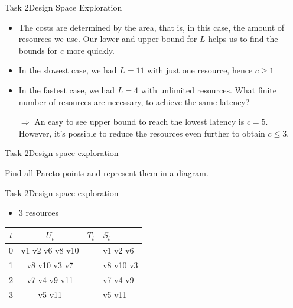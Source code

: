 \begin{frame}{Task 2}{Design Space Exploration}
    \begin{solution}
        \begin{itemize}
            \item The costs are determined by the area, that is, in this case, the amount of resources we use. Our lower and upper bound for $L$ helps us to find the bounds for $c$ more quickly.
            \item In the slowest case, we had $L = 11$ with just one resource, hence $c \geq 1$
            \item In the fastest case, we had $L = 4$ with unlimited resources. What finite number of resources are necessary, to achieve the same latency?
            \item [$\Rightarrow$] An easy to see upper bound to reach the lowest latency is $c = 5$. However, it's possible to reduce the resources even further to obtain $c \leq 3$.
        \end{itemize}
    \end{solution}
\end{frame}
\begin{frame}{Task 2}{Design space exploration}
    \begin{tasknoinc}
        Find all Pareto-points and represent them in a diagram.
    \end{tasknoinc}
\end{frame}

\begin{frame}{Task 2}{Design space exploration}
  \begin{itemize}
    \item $3$ resources
  \end{itemize}
  \begin{solutionnoinc}
    \centering
    \tiny
    \begin{tabular}{c|c|l|l|}
    \hline$t$ & $U_{t}$ & $T_{t}$ & $S_{t}$ \\
    \hline 0 & v1 v2 v6 v8 v10 & & v1 v2 v6 \\
    \hline 1 & v8 v10 v3 v7 & & v8 v10 v3 \\
    \hline 2 & v7 v4 v9 v11 & & v7 v4 v9 \\
    \hline 3 & v5 v11 & & v5 v11\\
    \hline
    \end{tabular}
  \end{solutionnoinc}
\end{frame}

